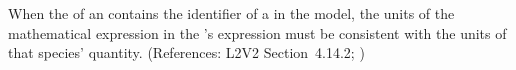 When the   of an \EventAssignment
contains the identifier of a \Species in the model, the
units of the mathematical expression in the
\EventAssignment's  expression must be
consistent with the units of that species' quantity.
(References: L2V2 Section~4.14.2; )

